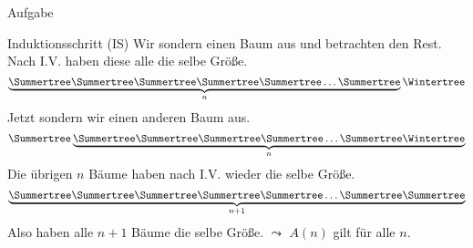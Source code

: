 {\begin{frame}[fragile]{Aufgabe}
{\begin{alertblock}{Induktionsschritt (IS)}
            Wir sondern einen Baum aus und betrachten den Rest. Nach I.V. haben diese alle die selbe Größe.
            \[\underbrace{\text{\Summertree}\text{\Summertree}\text{\Summertree}\text{\Summertree}\text{\Summertree}\dots\text{\Summertree}}_{n}\text{\Wintertree}\]
            Jetzt sondern wir einen anderen Baum aus.
            \[\text{\Summertree}\underbrace{\text{\Summertree}\text{\Summertree}\text{\Summertree}\text{\Summertree}\dots\text{\Summertree}\text{\Wintertree}}_{n}\]
            Die übrigen $n$ Bäume haben nach I.V. wieder die selbe Größe.
            \[\underbrace{\text{\Summertree}\text{\Summertree}\text{\Summertree}\text{\Summertree}\text{\Summertree}\dots\text{\Summertree}\text{\Summertree}}_{n+1}\]
            Also haben alle $n+1$ Bäume die selbe Größe.
            $\leadsto$ $A(n)$ gilt für alle $n$.
        \end{alertblock}
    }
\end{frame}
}

